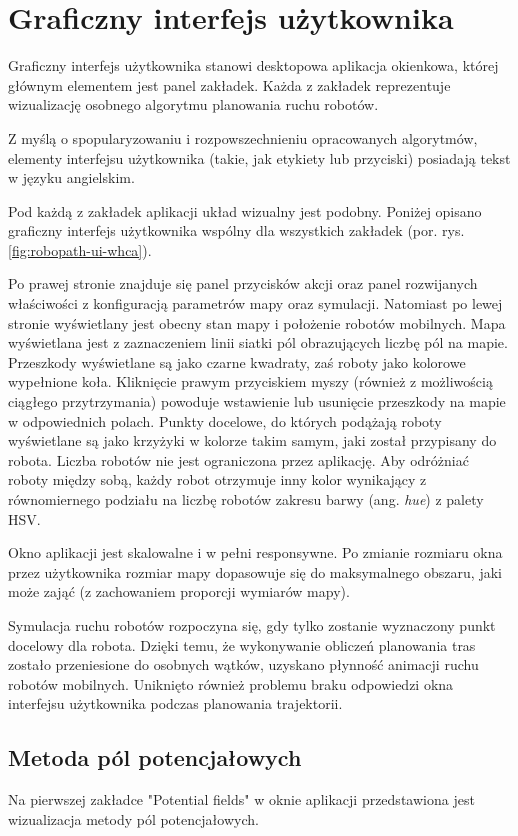\section{Graficzny interfejs użytkownika}
Graficzny interfejs użytkownika stanowi desktopowa aplikacja okienkowa, której głównym elementem jest panel zakładek. Każda z zakładek reprezentuje wizualizację osobnego algorytmu planowania ruchu robotów.

Z myślą o spopularyzowaniu i rozpowszechnieniu opracowanych algorytmów, elementy interfejsu użytkownika (takie, jak etykiety lub przyciski) posiadają tekst w języku angielskim.

Pod każdą z zakładek aplikacji układ wizualny jest podobny. Poniżej opisano graficzny interfejs użytkownika wspólny dla wszystkich zakładek (por. rys. \ref{fig:robopath-ui-whca}).

Po prawej stronie znajduje się panel przycisków akcji oraz panel rozwijanych właściwości z konfiguracją parametrów mapy oraz symulacji. Natomiast po lewej stronie wyświetlany jest obecny stan mapy i położenie robotów mobilnych. Mapa wyświetlana jest z zaznaczeniem linii siatki pól obrazujących liczbę pól na mapie. Przeszkody wyświetlane są jako czarne kwadraty, zaś roboty jako kolorowe wypełnione koła.
Kliknięcie prawym przyciskiem myszy (również z możliwością ciągłego przytrzymania) powoduje wstawienie lub usunięcie przeszkody na mapie w odpowiednich polach.
Punkty docelowe, do których podążają roboty wyświetlane są jako krzyżyki w kolorze takim samym, jaki został przypisany do robota. Liczba robotów nie jest ograniczona przez aplikację. Aby odróżniać roboty między sobą, każdy robot otrzymuje inny kolor wynikający z równomiernego podziału na liczbę robotów zakresu barwy (ang. {\it hue}) z palety HSV.

Okno aplikacji jest skalowalne i w pełni responsywne. Po zmianie rozmiaru okna przez użytkownika rozmiar mapy dopasowuje się do maksymalnego obszaru, jaki może zająć (z zachowaniem proporcji wymiarów mapy).

Symulacja ruchu robotów rozpoczyna się, gdy tylko zostanie wyznaczony punkt docelowy dla robota. Dzięki temu, że wykonywanie obliczeń planowania tras zostało przeniesione do osobnych wątków, uzyskano płynność animacji ruchu robotów mobilnych. Uniknięto również problemu braku odpowiedzi okna interfejsu użytkownika podczas planowania trajektorii.

\subsection{Metoda pól potencjałowych}
Na pierwszej zakładce "Potential fields" w oknie aplikacji przedstawiona jest wizualizacja metody pól potencjałowych.


